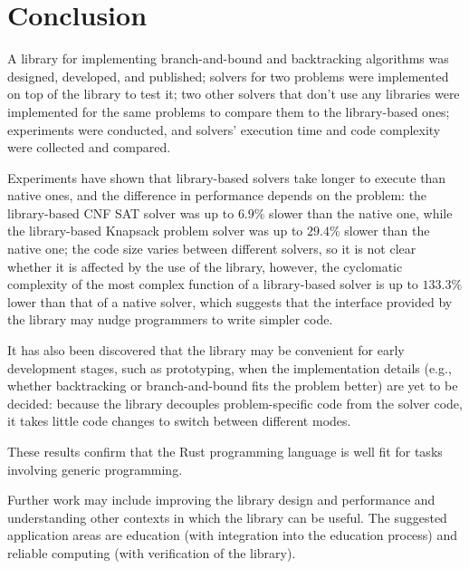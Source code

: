 \chapter{Conclusion}
\label{chap:concl}

A library for implementing branch-and-bound and backtracking algorithms was designed, developed,
and published; solvers for two problems were implemented on top of the library to test it;
two other solvers that don't use any libraries were implemented for the same problems to compare
them to the library-based ones; experiments were conducted, and solvers' execution time and
code complexity were collected and compared.

Experiments have shown that library-based solvers take longer to execute than native ones,
and the difference in performance depends on the problem: the library-based CNF SAT solver
was up to $6.9\%$ slower than the native one, while the library-based Knapsack problem solver was
up to $29.4\%$ slower than the native one; the code size varies between different solvers, so
it is not clear whether it is affected by the use of the library, however, the cyclomatic
complexity of the most complex function of a library-based solver is up to $133.3\%$ lower
than that of a native solver, which suggests that the interface provided by the library may
nudge programmers to write simpler code.

It has also been discovered that the library may be convenient for early development stages,
such as prototyping, when the implementation details (e.g., whether backtracking or
branch-and-bound fits the problem better) are yet to be decided: because the library decouples
problem-specific code from the solver code, it takes little code changes to switch between
different modes.

These results confirm that the Rust programming language is well fit for tasks involving
generic programming.

Further work may include improving the library design and performance and understanding
other contexts in which the library can be useful.
The suggested application areas are education (with integration into the education process)
and reliable computing (with verification of the library).
